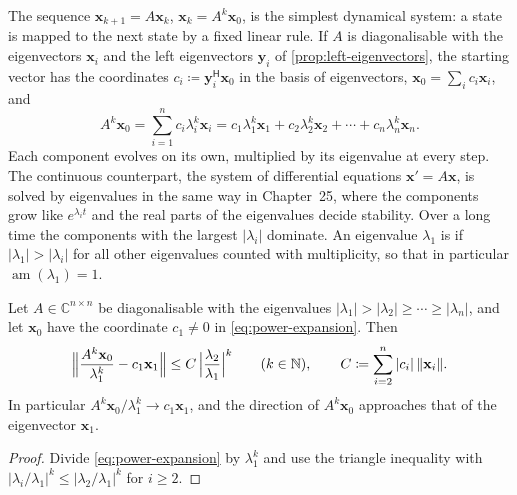 The sequence $\mathbf x_{k+1}=A\mathbf x_k$, $\mathbf x_k=A^k\mathbf x_0$, is the simplest dynamical system: a state is mapped to the next state by a fixed linear rule. If $A$ is diagonalisable with the eigenvectors $\mathbf x_i$ and the left eigenvectors $\mathbf y_i$ of \cref{prop:left-eigenvectors}, the starting vector has the coordinates $c_i\coloneqq\mathbf y_i^{\mathsf H}\mathbf x_0$ in the basis of eigenvectors, $\mathbf x_0=\sum_ic_i\mathbf x_i$, and
\begin{equation}
A^k\mathbf x_0=\sum_{i=1}^nc_i\lambda_i^k\mathbf x_i=c_1\lambda_1^k\mathbf x_1+c_2\lambda_2^k\mathbf x_2+\cdots+c_n\lambda_n^k\mathbf x_n .
\label{eq:power-expansion}
\end{equation}
Each component evolves on its own, multiplied by its eigenvalue at every step. The continuous counterpart, the system of differential equations $\mathbf x'=A\mathbf x$, is solved by eigenvalues in the same way in Chapter~25, where the components grow like $e^{\lambda_it}$ and the real parts of the eigenvalues decide stability. Over a long time the components with the largest $|\lambda_i|$ dominate. An eigenvalue $\lambda_1$ is  if $|\lambda_1|>|\lambda_i|$ for all other eigenvalues counted with multiplicity, so that in particular $\operatorname{am}(\lambda_1)=1$.

\begin{proposition}
\label{prop:dominant}
Let $A\in\mathbb C^{n\times n}$ be diagonalisable with the eigenvalues $|\lambda_1|>|\lambda_2|\ge\cdots\ge|\lambda_n|$, and let $\mathbf x_0$ have the coordinate $c_1\ne0$ in \eqref{eq:power-expansion}. Then
\[
\Bigl\|\frac{A^k\mathbf x_0}{\lambda_1^k}-c_1\mathbf x_1\Bigr\|\le C\,\Bigl|\frac{\lambda_2}{\lambda_1}\Bigr|^k\qquad(k\in\mathbb N),\qquad C\coloneqq\sum_{i=2}^n|c_i|\,\|\mathbf x_i\| .
\]
In particular $A^k\mathbf x_0/\lambda_1^k\to c_1\mathbf x_1$, and the direction of $A^k\mathbf x_0$ approaches that of the eigenvector $\mathbf x_1$.
\end{proposition}

\begin{proof}
Divide \eqref{eq:power-expansion} by $\lambda_1^k$ and use the triangle inequality with $|\lambda_i/\lambda_1|^k\le|\lambda_2/\lambda_1|^k$ for $i\ge2$.
\end{proof}

